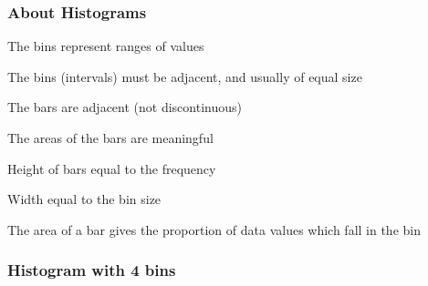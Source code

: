 \documentclass[12pt]{beamer}\usepackage[]{graphicx}\usepackage[]{color}
\makeatletter
\newenvironment{kframe}{%
 \def\at@end@of@kframe{}%
 \ifinner\ifhmode%
  \def\at@end@of@kframe{\end{minipage}}%
  \begin{minipage}{\columnwidth}%
 \fi\fi%
 \def\FrameCommand##1{\hskip\@totalleftmargin \hskip-\fboxsep
 \colorbox{shadecolor}{##1}\hskip-\fboxsep
     \hskip-\linewidth \hskip-\@totalleftmargin \hskip\columnwidth}%
 \MakeFramed {\advance\hsize-\width
   \@totalleftmargin\z@ \linewidth\hsize
   \@setminipage}}%
 {\par\unskip\endMakeFramed%
 \at@end@of@kframe}
\newenvironment{knitrout}{}{} %
\makeatother
\begin{document}

\begin{frame}
\frametitle{About Histograms}

\bi
  \item The bins represent ranges of values
  \item The bins (intervals) must be adjacent, and usually of equal size
  \item The bars are adjacent (not discontinuous)
  \item The areas of the bars are meaningful
  \item Height of bars equal to the frequency
  \item Width equal to the bin size
  \item The area of a bar gives the proportion of data values which fall in the bin
\ei

\end{frame}


\begin{frame}[fragile]
\frametitle{Histogram with 4 bins}
\begin{knitrout}\footnotesize
{}\color{fgcolor}\begin{kframe}


{\ttfamily\noindent\bfseries{}}

{\ttfamily\noindent\bfseries\color{errorcolor}{\#\# Error in axis(side = 1, at = seq(54, 124, 8)): plot.new has not been called yet}}

{\ttfamily\noindent\bfseries\color{errorcolor}{\#\# Error in axis(side = 2, at = seq(0, 12, 2), las = 2): plot.new has not been called yet}}\end{kframe}
\end{knitrout}

\end{frame}

\end{document}
